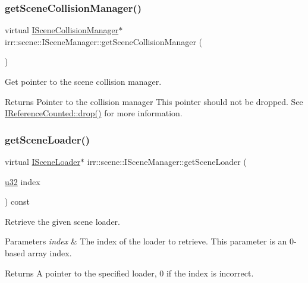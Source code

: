 \subsubsection{\texorpdfstring{get\+Scene\+Collision\+Manager()}{getSceneCollisionManager()}}
{\footnotesize\ttfamily virtual \hyperlink{classirr_1_1scene_1_1ISceneCollisionManager}{I\+Scene\+Collision\+Manager}$\ast$ irr\+::scene\+::\+I\+Scene\+Manager\+::get\+Scene\+Collision\+Manager (\begin{DoxyParamCaption}{ }\end{DoxyParamCaption})\hspace{0.3cm}{\ttfamily [pure virtual]}}



Get pointer to the scene collision manager. 

\begin{DoxyReturn}{Returns}
Pointer to the collision manager This pointer should not be dropped. See \hyperlink{classirr_1_1IReferenceCounted_a03856a09355b89d178090c4a5f738543}{I\+Reference\+Counted\+::drop()} for more information. 
\end{DoxyReturn}
\mbox{\label{classirr_1_1scene_1_1ISceneManager_a504fd792634ce0fbace4d13e70e4efab}} 
\subsubsection{\texorpdfstring{get\+Scene\+Loader()}{getSceneLoader()}}
{\footnotesize\ttfamily virtual \hyperlink{classirr_1_1scene_1_1ISceneLoader}{I\+Scene\+Loader}$\ast$ irr\+::scene\+::\+I\+Scene\+Manager\+::get\+Scene\+Loader (\begin{DoxyParamCaption}\item[{\hyperlink{namespaceirr_a0416a53257075833e7002efd0a18e804}{u32}}]{index }\end{DoxyParamCaption}) const\hspace{0.3cm}{\ttfamily [pure virtual]}}



Retrieve the given scene loader. 


\begin{DoxyParams}{Parameters}
{\em index} & The index of the loader to retrieve. This parameter is an 0-\/based array index. \\
\hline
\end{DoxyParams}
\begin{DoxyReturn}{Returns}
A pointer to the specified loader, 0 if the index is incorrect. 
\end{DoxyReturn}
\mbox{\label{classirr_1_1scene_1_1ISceneManager_a96d8272b74bd0adc9138f17e832dc887}} 
